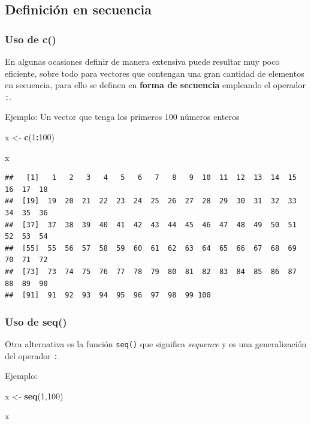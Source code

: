\documentclass[
]{book}
\newenvironment{Shaded}{\begin{snugshade}}{\end{snugshade}}
\newcommand{\DecValTok}[1]{\textcolor[rgb]{0.00,0.00,0.81}{#1}}
\newcommand{\FunctionTok}[1]{\textcolor[rgb]{0.13,0.29,0.53}{\textbf{#1}}}
\newcommand{\NormalTok}[1]{#1}
\newcommand{\OtherTok}[1]{\textcolor[rgb]{0.56,0.35,0.01}{#1}}
\newcommand{\SpecialCharTok}[1]{\textcolor[rgb]{0.81,0.36,0.00}{\textbf{#1}}}
\begin{document}
\hypertarget{definiciuxf3n-en-secuencia}{%
\subsection{Definición en secuencia}\label{definiciuxf3n-en-secuencia}}

\hypertarget{uso-de-c}{%
\subsubsection{Uso de c()}\label{uso-de-c}}

En algunas ocasiones definir de manera extensiva puede resultar muy poco eficiente, sobre todo para vectores que contengan una gran cantidad de elementos en secuencia, para ello se definen en \textbf{forma de secuencia} empleando el operador \texttt{:}.

Ejemplo:
Un vector que tenga los primeros 100 números enteros

\begin{Shaded}
\begin{Highlighting}[]
\NormalTok{x }\OtherTok{\textless{}{-}} \FunctionTok{c}\NormalTok{(}\DecValTok{1}\SpecialCharTok{:}\DecValTok{100}\NormalTok{)}

\NormalTok{x}
\end{Highlighting}
\end{Shaded}

\begin{verbatim}
##   [1]   1   2   3   4   5   6   7   8   9  10  11  12  13  14  15  16  17  18
##  [19]  19  20  21  22  23  24  25  26  27  28  29  30  31  32  33  34  35  36
##  [37]  37  38  39  40  41  42  43  44  45  46  47  48  49  50  51  52  53  54
##  [55]  55  56  57  58  59  60  61  62  63  64  65  66  67  68  69  70  71  72
##  [73]  73  74  75  76  77  78  79  80  81  82  83  84  85  86  87  88  89  90
##  [91]  91  92  93  94  95  96  97  98  99 100
\end{verbatim}

\hypertarget{uso-de-seq}{%
\subsubsection{Uso de seq()}\label{uso-de-seq}}

Otra alternativa es la función \texttt{seq()} que significa \emph{sequence} y es una generalización del operador \texttt{:}.

Ejemplo:

\begin{Shaded}
\begin{Highlighting}[]
\NormalTok{x }\OtherTok{\textless{}{-}} \FunctionTok{seq}\NormalTok{(}\DecValTok{1}\NormalTok{,}\DecValTok{100}\NormalTok{)}

\NormalTok{x}
\end{Highlighting}
\end{Shaded}
\end{document}

